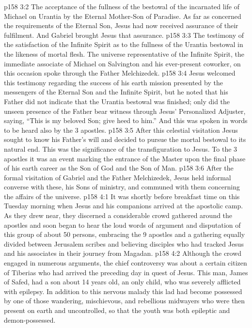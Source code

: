\vs p158 3:2 \bibnobreakspace The acceptance of the fullness of the bestowal of the incarnated life of Michael on Urantia by the Eternal Mother\hyp{}Son of Paradise. As far as concerned the requirements of the Eternal Son, Jesus had now received assurance of their fulfilment. And Gabriel brought Jesus that assurance.
\vs p158 3:3 \bibnobreakspace The testimony of the satisfaction of the Infinite Spirit as to the fullness of the Urantia bestowal in the likeness of mortal flesh. The universe representative of the Infinite Spirit, the immediate associate of Michael on Salvington and his ever\hyp{}present coworker, on this occasion spoke through the Father Melchizedek.
\vs p158 3:4 \pc Jesus welcomed this testimony regarding the success of his earth mission presented by the messengers of the Eternal Son and the Infinite Spirit, but he noted that his Father did not indicate that the Urantia bestowal was finished; only did the unseen presence of the Father bear witness through Jesus’ Personalized Adjuster, saying, “This is my beloved Son; give heed to him.” And this was spoken in words to be heard also by the 3 apostles.
\vs p158 3:5 After this celestial visitation Jesus sought to know his Father’s will and decided to pursue the mortal bestowal to its natural end. This was the significance of the transfiguration to Jesus. To the 3 apostles it was an event marking the entrance of the Master upon the final phase of his earth career as the Son of God and the Son of Man.
\vs p158 3:6 After the formal visitation of Gabriel and the Father Melchizedek, Jesus held informal converse with these, his Sons of ministry, and communed with them concerning the affairs of the universe.
\vs p158 4:1 It was shortly before breakfast time on this Tuesday morning when Jesus and his companions arrived at the apostolic camp. As they drew near, they discerned a considerable crowd gathered around the apostles and soon began to hear the loud words of argument and disputation of this group of about 50 persons, embracing the 9 apostles and a gathering equally divided between Jerusalem scribes and believing disciples who had tracked Jesus and his associates in their journey from Magadan.
\vs p158 4:2 Although the crowd engaged in numerous arguments, the chief controversy was about a certain citizen of Tiberias who had arrived the preceding day in quest of Jesus. This man, James of Safed, had a son about 14 years old, an only child, who was severely afflicted with epilepsy. In addition to this nervous malady this lad had become possessed by one of those wandering, mischievous, and rebellious midwayers who were then present on earth and uncontrolled, so that the youth was both epileptic and demon\hyp{}possessed.
